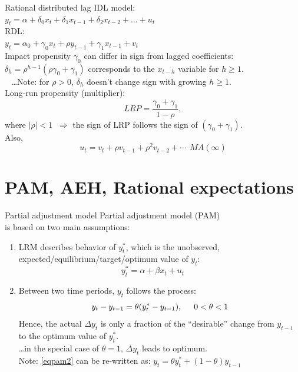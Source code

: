 \documentclass{beamer}
\begin{document}

\begin{frame}{Rational distributed lag}
IDL model:\\
\medskip
$ y_t = \alpha + \delta_0 x_t  + \delta_1 x_{t-1} + \delta_2 x_{t-2} + \dots + u_t $\\
\medskip
RDL:\\
\medskip
$y_t = \alpha_0+\gamma_0 x_t + \rho y_{t-1} +\gamma_1 x_{t-1} + v_t $\\
\medskip
Impact propensity $\gamma_0$ can differ in sign from lagged coefficients: \\ 
$\delta_h = \rho^{h-1}(\rho \gamma_0 + \gamma_1)$ corresponds to the $x_{t-h}$ variable for $h \geq 1$. \\
~ \dots Note: for $\rho > 0$, $\delta_h$ doesn't change sign with growing $h \geq 1$. \\
\vspace{0.3cm}
Long-run propensity (multiplier):
$$\textit{LRP} = \frac{\gamma_0+\gamma_1}{1-\rho},$$
where $|\rho| < 1$ $\> \Rightarrow$ the sign of LRP follows the sign of $(\gamma_0+\gamma_1)$. \\
\medskip
Also,
$$ u_t = v_t + \rho v_{t-1} + \rho^2 v_{t-2} + \cdots \> \>  MA(\infty)$$

\end{frame}


\section{PAM, AEH, Rational expectations}

\begin{frame}{Partial adjustment model}
Partial adjustment model (PAM) \\is based on two main assumptions:
\begin{enumerate}
\item LRM describes behavior of $y_t^{\ast}$, which is the unobserved, \\ 
expected/equilibrium/target/optimum value of $y_t$:
\begin{equation}
{y}_t^\ast = \alpha + \beta x_t + u_t  ~~~~~~~~  \label{eqpam1} 
\end{equation}
\item Between two time periods, $y_t$ follows the process:
\begin{equation}
y_t - y_{t-1} = \theta ( y_t^\ast-y_{t-1}), \hspace{0.5cm} 0 < \theta < 1 \label{eqpam2}
\end{equation}
Hence, the actual $\Delta y_t$ is only a fraction of the ``desirable'' change from $y_{t-1}$ to the optimum value of $y_t^\ast$.
\\ \dots in the special case of $\theta = 1$, $\Delta y_t$ leads to optimum.\\
\medskip
Note: \eqref{eqpam2} can be re-written as: $y_t= \theta {y}_t^\ast + (1-\theta)y_{t-1} $
\end{enumerate}

\end{frame}
\end{document}
